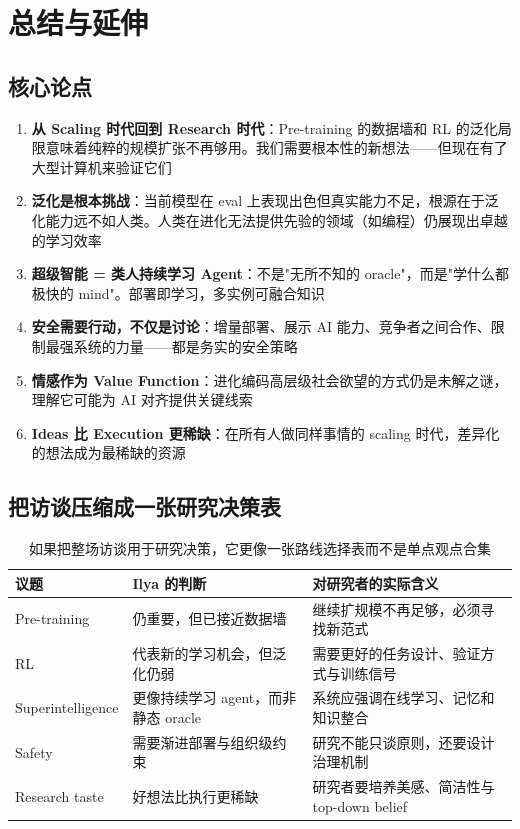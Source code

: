 \section{总结与延伸}

\subsection{核心论点}

\begin{enumerate}
    \item \textbf{从 Scaling 时代回到 Research 时代}：Pre-training 的数据墙和 RL 的泛化局限意味着纯粹的规模扩张不再够用。我们需要根本性的新想法——但现在有了大型计算机来验证它们
    \item \textbf{泛化是根本挑战}：当前模型在 eval 上表现出色但真实能力不足，根源在于泛化能力远不如人类。人类在进化无法提供先验的领域（如编程）仍展现出卓越的学习效率
    \item \textbf{超级智能 = 类人持续学习 Agent}：不是"无所不知的 oracle"，而是"学什么都极快的 mind"。部署即学习，多实例可融合知识
    \item \textbf{安全需要行动，不仅是讨论}：增量部署、展示 AI 能力、竞争者之间合作、限制最强系统的力量——都是务实的安全策略
    \item \textbf{情感作为 Value Function}：进化编码高层级社会欲望的方式仍是未解之谜，理解它可能为 AI 对齐提供关键线索
    \item \textbf{Ideas 比 Execution 更稀缺}：在所有人做同样事情的 scaling 时代，差异化的想法成为最稀缺的资源
\end{enumerate}

\subsection{把访谈压缩成一张研究决策表}

\begin{table}[H]
\centering
\begin{tabular}{p{3.1cm}p{3.8cm}p{4.6cm}}
\toprule
\textbf{议题} & \textbf{Ilya 的判断} & \textbf{对研究者的实际含义} \\
\midrule
Pre-training & 仍重要，但已接近数据墙 & 继续扩规模不再足够，必须寻找新范式 \\
RL & 代表新的学习机会，但泛化仍弱 & 需要更好的任务设计、验证方式与训练信号 \\
Superintelligence & 更像持续学习 agent，而非静态 oracle & 系统应强调在线学习、记忆和知识整合 \\
Safety & 需要渐进部署与组织级约束 & 研究不能只谈原则，还要设计治理机制 \\
Research taste & 好想法比执行更稀缺 & 研究者要培养美感、简洁性与 top-down belief \\
\bottomrule
\end{tabular}
\caption{如果把整场访谈用于研究决策，它更像一张路线选择表而不是单点观点合集}
\end{table}

